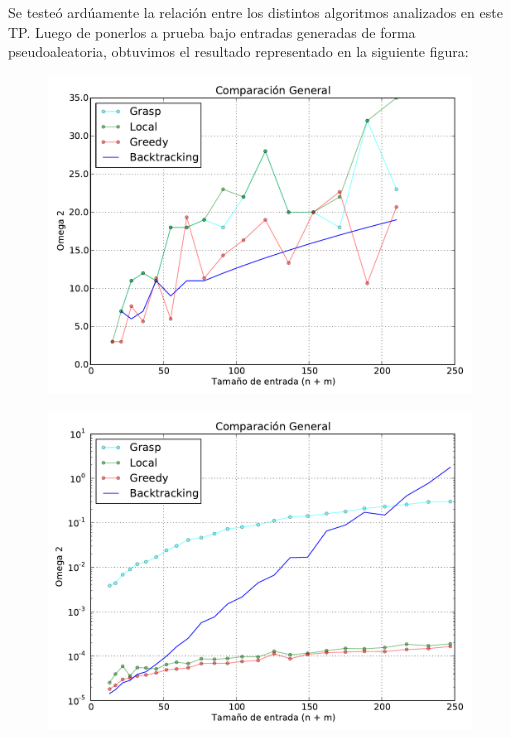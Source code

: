 Se testeó ardúamente la relación entre los distintos algoritmos analizados en este TP. Luego de ponerlos a prueba bajo entradas generadas de forma pseudoaleatoria, obtuvimos el resultado representado en la siguiente figura:

  \begin{figure}[H]
    \includegraphics[angle=90]{imagenes/todas_2014-06-27_19-05-53.pdf}
    \label{fig:comparativa}
  \end{figure}

\begin{figure}[H]
\begin{center}
\includegraphics[angle=0, scale=.75]{imagenes/todas-tiempo.pdf}
\label{grafico local}
\end{center}
\end{figure}


